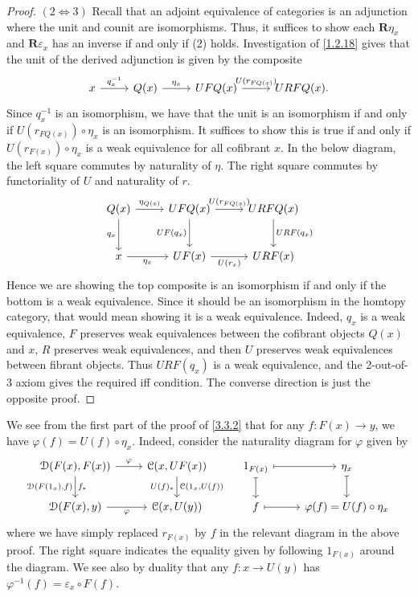 \begin{proof}
	$(2\iff 3)$ Recall that an adjoint equivalence of categories is an adjunction where the unit and counit are isomorphisms. Thus, it suffices to show each $\mathbf{R} \eta_x$ and $\mathbf{R} \varepsilon _x$ has an inverse if and only if (2) holds. Investigation of \cref{1.2.18} gives that the unit of the derived adjunction is given by the composite
	\[\begin{tikzcd}[row sep = 2.5em, column sep = 2.5em]
		x \ar[" q_x^{-1}  ", r]  & Q(x)\ar[" \eta_x ", r]  & UFQ(x)\ar[" U(r_{FQ(x)} ) ", r] & URFQ(x).
	\end{tikzcd}\]
	 Since $q_x^{-1} $ is an isomorphism, we have that the unit is an isomorphism if and only if $U(r_{FQ(x)}) \circ \eta_x$ is an isomorphism. It suffices to show this is true if and only if $U(r_{F(x)} )\circ \eta_x$ is a weak equivalence for all cofibrant $x$. In the below diagram, the left square commutes by naturality of $\eta$. The right square commutes by functoriality of $U$ and naturality of $r$.
	 \[\begin{tikzcd}[row sep = 2.5em, column sep = 2.5em]
	 Q(x)\ar[" \eta_{Q(x)}  ", r] \ar[" q_x "', d]  & UFQ(x)\ar[" UF(q_x) "', d] \ar[" U(r_{FQ(x)} ) ", r]  & URFQ(x)\ar[" URF(q_x) ", d]  \\
	 x \ar[" \eta_x "', r]  & UF(x)\ar[" U(r_x) "', r]  & URF(x)
	 \end{tikzcd}\]
	 Hence we are showing the top composite is an isomorphism if and only if the bottom is a weak equivalence. Since it should be an isomorphism in the homtopy category, that would mean showing it is a weak equivalence. Indeed, $q_x$ is a weak equivalence, $F$ preserves weak equivalences between the cofibrant objects $Q(x)$ and $x$, $R$ preserves weak equivalences, and then $U$ preserves weak equivalences between fibrant objects. Thus $URF(q_x)$ is a weak equivalence, and the 2-out-of-3 axiom gives the required iff condition. The converse direction is just the opposite proof.
\end{proof}

\begin{remark}\label{3.3.3}
	We see from the first part of the proof of \cref{3.3.2} that for any $f : F(x) \to y$, we have $\varphi(f)=U(f)\circ \eta_x$. Indeed, consider the naturality diagram for $\varphi$ given by
	\[\begin{tikzcd}
	{\mathcal{D}(F(x),F(x))} & {\mathcal{C}(x,UF(x))} & {1_{F(x)}} & {\eta_x} \\
	{\mathcal{D}(F(x),y)} & {\mathcal{C}(x,U(y))} & {f} & {\varphi(f)=U(f)\circ\eta_x}
	\arrow["\varphi", from=1-1, to=1-2]
	\arrow["f_*", " \mathcal{D} (F(1_x)\text{,} f) "', from=1-1, to=2-1]
	\arrow["U(f)_*"', " \mathcal{C} (1_x\text{,} U(f)) ", from=1-2, to=2-2]
	\arrow[maps to, from=1-3, to=1-4]
	\arrow[maps to, from=1-3, to=2-3]
	\arrow[maps to, from=1-4, to=2-4]
	\arrow["\varphi"', from=2-1, to=2-2]
	\arrow[maps to, from=2-3, to=2-4]
	\end{tikzcd}\]
	where we have simply replaced $r_{F(x)} $ by $f$ in the relevant diagram in the above proof. The right square indicates the equality given by following $1_{F(x)} $ around the diagram. We see also by duality that any $f : x \to U(y)$ has $\varphi^{-1} (f)=\varepsilon_x \circ F(f)$.
\end{remark}

